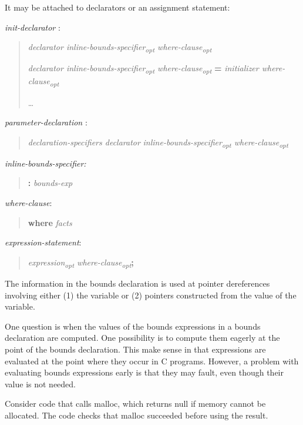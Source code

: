 \documentclass[]{article}
\begin{document}
It may be attached to declarators or an assignment statement:

\emph{init-declarator} :

\begin{quote}
\emph{declarator inline-bounds-specifier\textsubscript{opt}
where-clause\textsubscript{opt}}

\emph{declarator inline-bounds-specifier\textsubscript{opt}
where-clause\textsubscript{opt}} \textbf{=} \emph{initializer
where-clause\textsubscript{opt}}

\ldots{}
\end{quote}

\emph{parameter-declaration} :

\begin{quote}
\emph{declaration-specifiers declarator}
\emph{inline-bounds-specifier\textsubscript{opt}
where-clause\textsubscript{opt}}
\end{quote}

\emph{inline-bounds-specifier:}

\begin{quote}
\textbf{:} \emph{bounds-exp}
\end{quote}

\emph{where-clause}:

\begin{quote}
\textbf{where} \emph{facts}
\end{quote}

\emph{expression-statement}:

\begin{quote}
\emph{expression\textsubscript{opt}
where-clause\textsubscript{opt}}\textbf{;}
\end{quote}

The information in the bounds declaration is used at pointer
dereferences involving either (1) the variable or (2) pointers
constructed from the value of the variable.

One question is when the values of the bounds expressions in a bounds
declaration are computed. One possibility is to compute them eagerly at
the point of the bounds declaration. This make sense in that expressions
are evaluated at the point where they occur in C programs. However, a
problem with evaluating bounds expressions early is that they may fault,
even though their value is not needed.

Consider code that calls malloc, which returns null if memory cannot be
allocated. The code checks that malloc succeeded before using the
result.
\end{document}
